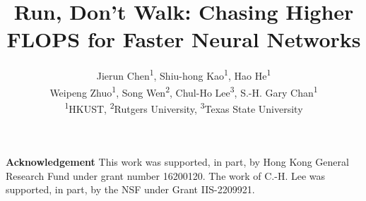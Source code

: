 \documentclass[10pt,twocolumn,letterpaper]{article}
\begin{document}
\title{Run, Don't Walk: Chasing Higher FLOPS for Faster Neural Networks}
\author{Jierun Chen\textsuperscript{1}, Shiu-hong Kao\textsuperscript{1}, Hao He\textsuperscript{1} \\
Weipeng Zhuo\textsuperscript{1}, Song Wen\textsuperscript{2}, Chul-Ho Lee\textsuperscript{3}, S.-H. Gary Chan\textsuperscript{1}\\
\textsuperscript{1}HKUST,
\textsuperscript{2}Rutgers University,
\textsuperscript{3}Texas State University\\
}
\maketitle








\medskip\noindent\textbf{Acknowledgement} \enspace
This work was supported, in part, by Hong Kong General Research Fund under grant number 16200120. The work of C.-H. Lee was supported, in part, by the NSF under Grant IIS-2209921.


{\small


}
\end{document}
